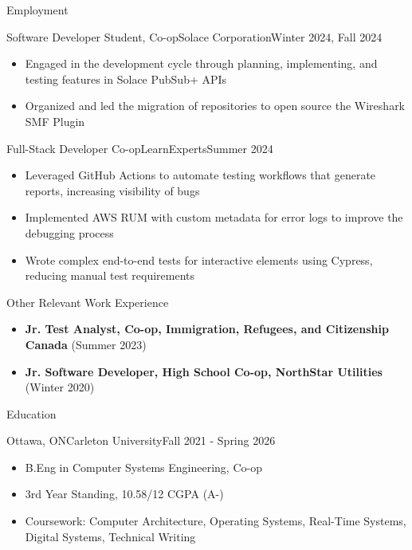 \documentclass[]{mcdowellcv}
\begin{document}
	\begin{cvsection}{Employment}
		
	\begin{cvsubsection}{Software Developer Student, Co-op}{Solace Corporation}{Winter 2024, Fall 2024}			
		\begin{itemize}
			\item Engaged in the development cycle through planning, implementing, and testing features in Solace PubSub+ APIs
			\item Organized and led the migration of repositories to open source the Wireshark SMF Plugin
		\end{itemize}
	\end{cvsubsection}

	\begin{cvsubsection}{Full-Stack Developer Co-op}{LearnExperts}{Summer 2024}			
		\begin{itemize}
			\item Leveraged GitHub Actions to automate testing workflows that generate reports, increasing visibility of bugs
			\item Implemented AWS RUM with custom metadata for error logs to improve the debugging process
			\item Wrote complex end-to-end tests for interactive elements using Cypress, reducing manual test requirements
		\end{itemize}
	\end{cvsubsection}

	\begin{cvsubsection}{Other Relevant Work Experience}{}{}
		\begin{itemize}
			\item \textbf{Jr. Test Analyst, Co-op, Immigration, Refugees, and Citizenship Canada} (Summer 2023)
			\item \textbf{Jr. Software Developer, High School Co-op, NorthStar Utilities} (Winter 2020)
		\end{itemize}
	\end{cvsubsection}
	\end{cvsection}

	\begin{cvsection}{Education}
		\begin{cvsubsection}{Ottawa, ON}{Carleton University}{Fall 2021 - Spring 2026}
			\begin{itemize}
				\item B.Eng in Computer Systems Engineering, Co-op
				\item 3rd Year Standing, 10.58/12 CGPA (A-)
				\item Coursework: Computer Architecture, Operating Systems, Real-Time Systems, Digital Systems, Technical Writing
			\end{itemize}
		\end{cvsubsection}
	\end{cvsection}
	
\end{document}

